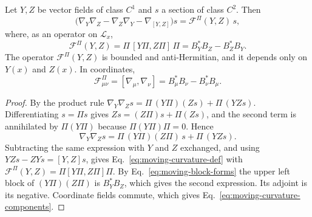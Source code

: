 \begin{proposition}
\label{prop:moving-curvature}
Let $Y,Z$ be vector fields of class $C^1$ and $s$ a section of class $C^2$. Then
\begin{equation}
 \bigl(\nabla_Y\nabla_Z-\nabla_Z\nabla_Y-\nabla_{[Y,Z]}\bigr)s=\mathcal F^\Pi(Y,Z)\,s ,
 \label{eq:moving-curvature-def}
\end{equation}
where, as an operator on $\mathcal L_x$,
\begin{equation}
 \mathcal F^\Pi(Y,Z)=\Pi\,[Y\Pi,Z\Pi]\,\Pi=B_Y^*B_Z-B_Z^*B_Y .
 \label{eq:moving-curvature}
\end{equation}
The operator $\mathcal F^\Pi(Y,Z)$ is bounded and anti-Hermitian, and it depends only on $Y(x)$ and $Z(x)$. In coordinates,
\begin{equation}
 \mathcal F^\Pi_{\mu\nu}=[\nabla_\mu,\nabla_\nu]=B_\mu^*B_\nu-B_\nu^*B_\mu .
 \label{eq:moving-curvature-components}
\end{equation}
\end{proposition}
\begin{proof}
By the product rule $\nabla_Y\nabla_Zs=\Pi\,(Y\Pi)(Zs)+\Pi\,(YZs)$. Differentiating $s=\Pi s$ gives $Zs=(Z\Pi)s+\Pi(Zs)$, and the second term is annihilated by $\Pi(Y\Pi)$ because $\Pi(Y\Pi)\Pi=0$. Hence
\[
 \nabla_Y\nabla_Zs=\Pi\,(Y\Pi)(Z\Pi)\,s+\Pi\,(YZs).
\]
Subtracting the same expression with $Y$ and $Z$ exchanged, and using $YZs-ZYs=[Y,Z]s$, gives Eq.~\eqref{eq:moving-curvature-def} with $\mathcal F^\Pi(Y,Z)=\Pi[Y\Pi,Z\Pi]\Pi$. By Eq.~\eqref{eq:moving-block-forms} the upper left block of $(Y\Pi)(Z\Pi)$ is $B_Y^*B_Z$, which gives the second expression. Its adjoint is its negative. Coordinate fields commute, which gives Eq.~\eqref{eq:moving-curvature-components}.
\end{proof}

